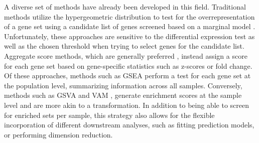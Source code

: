 A diverse set of methods have already been developed in this field. Traditional methods utilize the hypergeometric distribution to test for the overrepresentation of a gene set using a candidate list of genes screened based on a marginal model \cite{goeman2007}. Unfortunately, these approaches are sensitive to the differential expression test as well as the chosen threshold when trying to select genes for the candidate list. Aggregate score methods, which are generally preferred \cite{irizarry2009}, instead assign a score for each gene set based on gene-specific statistics such as z-scores or fold change. Of these approaches, methods such as GSEA \cite{subramanian2005} perform a test for each gene set at the population level, summarizing information across all samples. Conversely, methods such as GSVA \cite{hanzelmann2013} and VAM \cite{frost2020}, generate enrichment scores at the sample level and are more akin to a transformation. In addition to being able to screen for enriched sets per sample, this strategy also allows for the flexible incorporation of different downstream analyses, such as fitting prediction models, or performing dimension reduction.  

